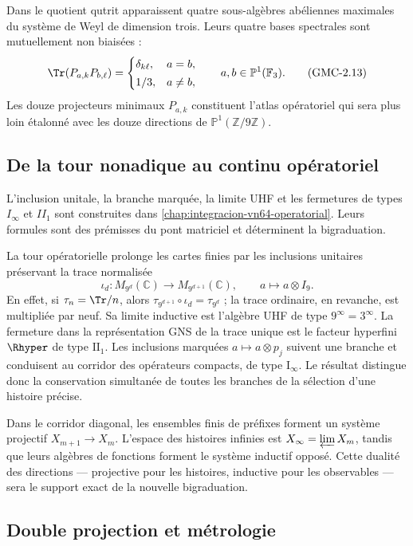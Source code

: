 Dans le quotient qutrit apparaissent quatre sous-algèbres abéliennes maximales du
système de Weyl de dimension trois. Leurs quatre bases spectrales sont
mutuellement non biaisées :
\[
 \Tr(P_{a,k}P_{b,\ell})=
 \begin{cases}
  \delta_{k\ell},&a=b,\\[2pt]
  1/3,&a\ne b,
 \end{cases}
 \qquad a,b\in\mathbb P^1(\mathbb F_3).
 \tag{GMC-2.13}
\]
Les douze projecteurs minimaux $P_{a,k}$ constituent l'atlas opératoriel qui sera
plus loin étalonné avec les douze directions de
$\mathbb P^1(\mathbb Z/9\mathbb Z)$.

\subsection{De la tour nonadique au continu opératoriel}

L'inclusion unitale, la branche marquée, la limite UHF et les fermetures de types
\(I_\infty\) et \(II_1\) sont construites dans
\cref{chap:integracion-vn64-operatorial}. Leurs formules sont des prémisses du pont
matriciel et déterminent la bigraduation.

La tour opératorielle prolonge les cartes finies par les
inclusions unitaires préservant la trace normalisée
\[
 \iota_d:M_{9^d}(\mathbb C)\longrightarrow M_{9^{d+1}}(\mathbb C),
 \qquad a\longmapsto a\otimes I_9.
 \tag{GMC-2.14}
\]
En effet, si $\tau_n=\Tr/n$, alors
$\tau_{9^{d+1}}\circ\iota_d=\tau_{9^d}$ ; la trace ordinaire, en revanche, est
multipliée par neuf. 
Sa limite inductive est l'algèbre UHF de type $9^\infty=3^\infty$. La fermeture
dans la représentation GNS de la trace unique est le facteur hyperfini
$\Rhyper$ de type $\mathrm{II}_1$. Les inclusions marquées
$a\mapsto a\otimes p_j$ suivent une branche et conduisent au corridor des opérateurs compacts,
de type $\mathrm I_\infty$. Le résultat distingue donc la conservation
simultanée de toutes les branches de la sélection d'une histoire précise.

Dans le corridor diagonal, les ensembles finis de préfixes forment un système
projectif $X_{m+1}\to X_m$. L'espace des histoires infinies est
$X_\infty=\varprojlim X_m$, tandis que leurs algèbres de fonctions forment le
système inductif opposé. Cette dualité des directions --- projective pour les
histoires, inductive pour les observables --- sera le support exact de la nouvelle
bigraduation.

\subsection{Double projection et métrologie}

